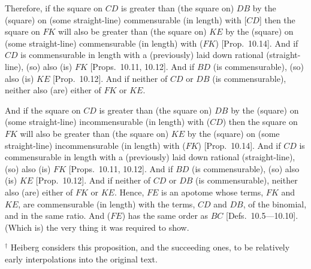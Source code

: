 \begin{Parallel}{}{}
{  Therefore, if the square on $CD$ is greater than (the square on) $DB$
  by the (square) on (some straight-line) commensurable  (in length) with [$CD$]  then the square on $FK$ will also be greater than (the square on) $KE$
  by the (square) on (some straight-line) commensurable  (in length) with ($FK$) [Prop.~10.14]. And if $CD$ is commensurable in length with a (previously) laid down rational (straight-line), (so) also (is) $FK$ [Props.~10.11, 10.12]. And if $BD$ (is commensurable), (so) also (is) $KE$ [Prop.~10.12]. And if neither of
  $CD$ or $DB$ (is commensurable), neither also (are) either of $FK$ or $KE$.
  
And if the square on $CD$ is greater than (the square on) $DB$
  by the (square) on (some straight-line) incommensurable  (in length) with ($CD$)  then the square on $FK$ will also be greater than (the square on) $KE$
  by the (square) on (some straight-line) incommensurable  (in length) with ($FK$) [Prop.~10.14]. And if $CD$ is commensurable in length with a (previously) laid down rational (straight-line), (so) also  (is) $FK$ [Props.~10.11, 10.12]. And if $BD$ (is commensurable), (so) also (is) $KE$ [Prop.~10.12]. And if neither of
  $CD$ or $DB$ (is commensurable), neither also (are) either of $FK$ or $KE$.
  Hence, $FE$ is an apotome whose terms, $FK$ and $KE$, are
  commensurable (in length) with the terms, $CD$ and $DB$, of the binomial,
  and in the same ratio. And ($FE$) has the same order as $BC$ [Defs.~10.5---10.10]. 
  (Which is) the very thing it was required to show.}
  \end{Parallel}
{\footnotesize\noindent$^\dag$ Heiberg considers this proposition, and
the succeeding ones, to be  relatively early interpolations into the original
text.}

